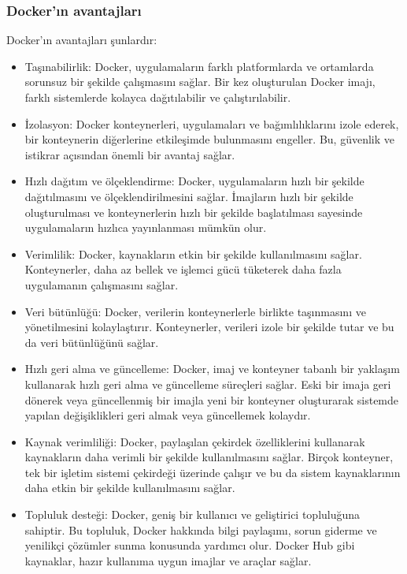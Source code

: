 \subsubsection{Docker'ın avantajları }
Docker'ın avantajları şunlardır:
\begin{itemize}
\item Taşınabilirlik: Docker, uygulamaların farklı platformlarda ve ortamlarda sorunsuz bir şekilde çalışmasını sağlar. Bir kez oluşturulan Docker imajı, farklı sistemlerde kolayca dağıtılabilir ve çalıştırılabilir.

\item İzolasyon: Docker konteynerleri, uygulamaları ve bağımlılıklarını izole ederek, bir konteynerin diğerlerine etkileşimde bulunmasını engeller. Bu, güvenlik ve istikrar açısından önemli bir avantaj sağlar.

\item Hızlı dağıtım ve ölçeklendirme: Docker, uygulamaların hızlı bir şekilde dağıtılmasını ve ölçeklendirilmesini sağlar. İmajların hızlı bir şekilde oluşturulması ve konteynerlerin hızlı bir şekilde başlatılması sayesinde uygulamaların hızlıca yayınlanması mümkün olur.

\item Verimlilik: Docker, kaynakların etkin bir şekilde kullanılmasını sağlar. Konteynerler, daha az bellek ve işlemci gücü tüketerek daha fazla uygulamanın çalışmasını sağlar.

\item Veri bütünlüğü: Docker, verilerin konteynerlerle birlikte taşınmasını ve yönetilmesini kolaylaştırır. Konteynerler, verileri izole bir şekilde tutar ve bu da veri bütünlüğünü sağlar.

\item Hızlı geri alma ve güncelleme: Docker, imaj ve konteyner tabanlı bir yaklaşım kullanarak hızlı geri alma ve güncelleme süreçleri sağlar. Eski bir imaja geri dönerek veya güncellenmiş bir imajla yeni bir konteyner oluşturarak sistemde yapılan değişiklikleri geri almak veya güncellemek kolaydır.

\item Kaynak verimliliği: Docker, paylaşılan çekirdek özelliklerini kullanarak kaynakların daha verimli bir şekilde kullanılmasını sağlar. Birçok konteyner, tek bir işletim sistemi çekirdeği üzerinde çalışır ve bu da sistem kaynaklarının daha etkin bir şekilde kullanılmasını sağlar.

\item Topluluk desteği: Docker, geniş bir kullanıcı ve geliştirici topluluğuna sahiptir. Bu topluluk, Docker hakkında bilgi paylaşımı, sorun giderme ve yenilikçi çözümler sunma konusunda yardımcı olur. Docker Hub gibi kaynaklar, hazır kullanıma uygun imajlar ve araçlar sağlar.
\end{itemize}

